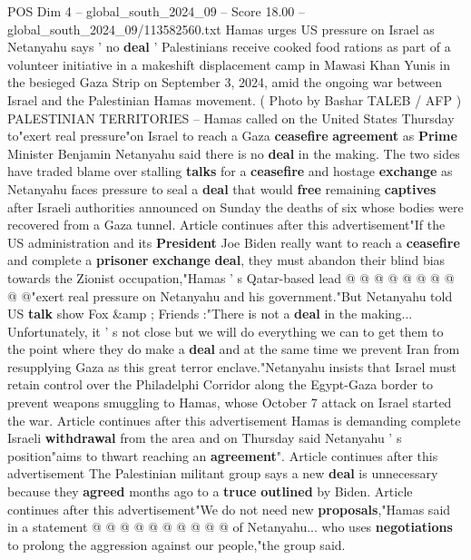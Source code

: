 \begin{textsample}{POS Dim 4 – global\_south\_2024\_09 – Score 18.00 – global\_south\_2024\_09/113582560.txt}  \label{ex:f4_pos_278}
Hamas urges US pressure on Israel as Netanyahu says ' no \textbf{deal} ' Palestinians receive cooked food rations as part of a volunteer initiative in a makeshift displacement camp in Mawasi Khan Yunis in the besieged Gaza Strip on September 3, 2024, amid the ongoing war between Israel and the Palestinian Hamas movement. ( Photo by Bashar TALEB / AFP ) PALESTINIAN TERRITORIES -- Hamas called on the United States Thursday to"exert real pressure"on Israel to reach a Gaza \textbf{ceasefire} \textbf{agreement} as \textbf{Prime} Minister Benjamin Netanyahu said there is no \textbf{deal} in the making.
The two sides have traded blame over stalling \textbf{talks} for a \textbf{ceasefire} and hostage \textbf{exchange} as Netanyahu faces pressure to seal a \textbf{deal} that would \textbf{free} remaining \textbf{captives} after Israeli authorities announced on Sunday the deaths of six whose bodies were recovered from a Gaza tunnel.
Article continues after this advertisement"If the US administration and its \textbf{President} Joe Biden really want to reach a \textbf{ceasefire} and complete a \textbf{prisoner} \textbf{exchange} \textbf{deal}, they must abandon their blind bias towards the Zionist occupation,"Hamas ' s Qatar-based lead @ @ @ @ @ @ @ @ @ @"exert real pressure on Netanyahu and his government."But Netanyahu told US \textbf{talk} show Fox \&amp ; Friends :"There is not a \textbf{deal} in the making...
Unfortunately, it ' s not close but we will do everything we can to get them to the point where they do make a \textbf{deal} and at the same time we prevent Iran from resupplying Gaza as this great terror enclave."Netanyahu insists that Israel must retain control over the Philadelphi Corridor along the Egypt-Gaza border to prevent weapons smuggling to Hamas, whose October 7 attack on Israel started the war.
Article continues after this advertisement Hamas is demanding complete Israeli \textbf{withdrawal} from the area and on Thursday said Netanyahu ' s position"aims to thwart reaching an \textbf{agreement}".
Article continues after this advertisement The Palestinian militant group says a new \textbf{deal} is unnecessary because they \textbf{agreed} months ago to a \textbf{truce} \textbf{outlined} by Biden.
Article continues after this advertisement"We do not need new \textbf{proposals},"Hamas said in a statement @ @ @ @ @ @ @ @ @ @ of Netanyahu... who uses \textbf{negotiations} to prolong the aggression against our people,"the group said.

\end{textsample}

